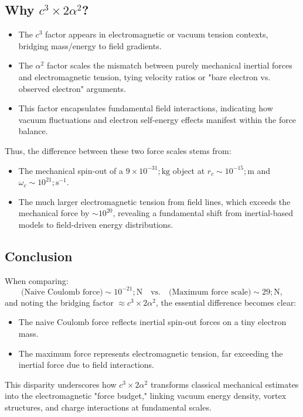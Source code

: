 \documentclass[a4paper,10pt]{article}
\begin{document}
\subsection*{Why $c^3 \times 2 \alpha^2$?}


\begin{itemize}
\item The $c^3$ factor appears in electromagnetic or vacuum tension contexts, bridging mass/energy to field gradients.
\item The $\alpha^2$ factor scales the mismatch between purely mechanical inertial forces and electromagnetic tension, tying velocity ratios or "bare electron vs. observed electron" arguments.
\item This factor encapsulates fundamental field interactions, indicating how vacuum fluctuations and electron self-energy effects manifest within the force balance.
\end{itemize}


Thus, the difference between these two force scales stems from:
\begin{itemize}
\item The mechanical spin-out of a $9 \times 10^{-31} ; \mathrm{kg}$ object at $r_c \sim 10^{-15} ; \mathrm{m}$ and $\omega_c \sim 10^{21} ; \mathrm{s^{-1}}$.
\item The much larger electromagnetic tension from field lines, which exceeds the mechanical force by $\sim 10^{20}$, revealing a fundamental shift from inertial-based models to field-driven energy distributions.
\end{itemize}


\subsection*{Conclusion}


When comparing:
\begin{equation*}
\text{(Naive Coulomb force)} \sim 10^{-21} ; \mathrm{N} \quad \text{vs.} \quad \text{(Maximum force scale)} \sim 29 ; \mathrm{N},
\end{equation*}
and noting the bridging factor $\approx c^3 \times 2 \alpha^2$, the essential difference becomes clear:
\begin{itemize}
\item The naive Coulomb force reflects inertial spin-out forces on a tiny electron mass.
\item The maximum force represents electromagnetic tension, far exceeding the inertial force due to field interactions.
\end{itemize}
This disparity underscores how $c^3 \times 2 \alpha^2$ transforms classical mechanical estimates into the electromagnetic "force budget," linking vacuum energy density, vortex structures, and charge interactions at fundamental scales.
\end{document}
